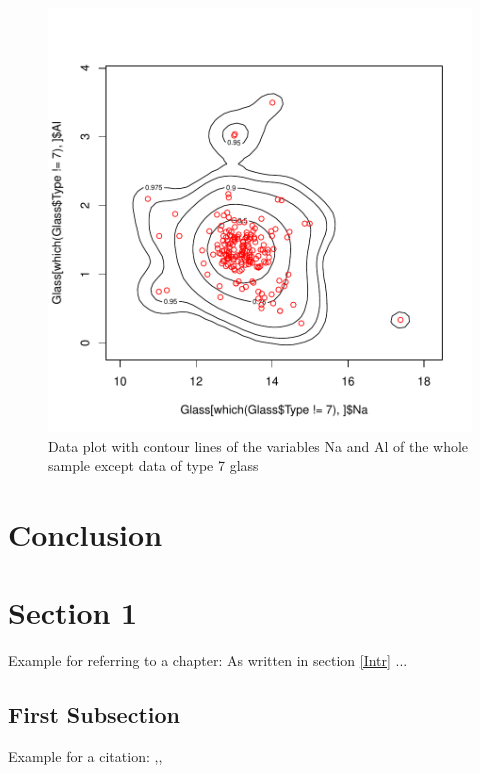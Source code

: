 \documentclass[a4paper, 12pt, titlepage, headsepline, listof = totoc, bibliography = totoc, numbers = noenddot]{scrartcl}
\begin{document}
\begin{figure}[h!]
\includegraphics[width=\textwidth]{report-contourGlassNaAl-7}
\caption{Data plot with contour lines of the variables Na and Al of the whole sample except data of type 7 glass}
\label{fig:contourGlassNaAl-7}
\end{figure}


\newpage
\section{Conclusion}












\newpage
\section{Section 1}
Example for referring to a chapter: As written in section \ref{Intr} ...

  \subsection{First Subsection}
	Example for a citation: \cite{sqltuerker},\cite{journals/jods/VolzSM05}, \cite{das}\\
\end{document}

